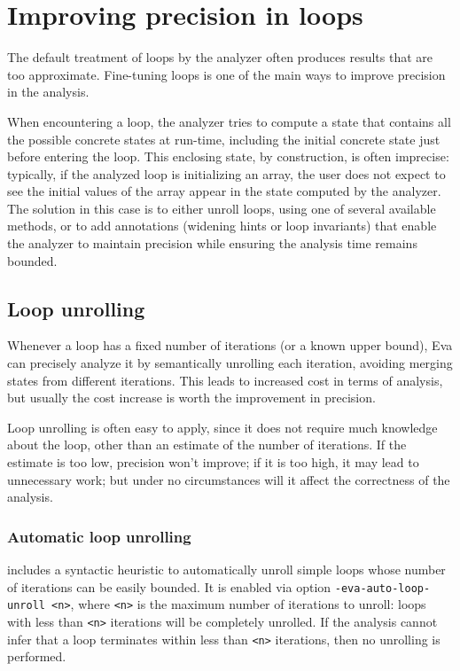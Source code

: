 \documentclass{frama-c-book}
\begin{document}
\section{Improving precision in loops}
\label{boucles-traitement}

The default treatment of loops by the analyzer often produces
results that are too approximate.
Fine-tuning loops is one of the main ways to improve precision in the analysis.

When encountering a loop, the analyzer tries to compute a state
that contains all the possible concrete states at run-time,
including the initial concrete state just before entering the loop.
This enclosing state, by construction, is often imprecise:
typically, if the analyzed loop is initializing an array,
the user does not expect to see the initial values of
the array appear in the state computed by the analyzer.
The solution in this case is to either unroll loops, using one of several
available methods, or to add annotations (widening hints or loop invariants)
that enable the analyzer to maintain precision while ensuring the analysis
time remains bounded.

\subsection{Loop unrolling}
\label{loop-unroll}

Whenever a loop has a fixed number of iterations (or a known upper bound),
Eva can precisely analyze it by semantically unrolling each iteration,
avoiding merging states from different iterations.
This leads to increased cost in terms of analysis, but usually the cost
increase is worth the improvement in precision.

Loop unrolling is often easy to apply, since it does not require much
knowledge about the loop, other than an estimate of the number of iterations.
If the estimate is too low, precision won't improve; if it is too high,
it may lead to unnecessary work; but under no circumstances will it affect the
correctness of the analysis.

\subsubsection{Automatic loop unrolling}

\Eva{} includes a syntactic heuristic to automatically unroll simple loops
whose number of iterations can be easily bounded.
It is enabled via option \lstinline|-eva-auto-loop-unroll <n>|, where
\lstinline|<n>| is the maximum number of iterations to unroll: loops with
less than \lstinline|<n>| iterations will be completely unrolled.
If the analysis cannot infer that a loop terminates within less than
\lstinline|<n>| iterations, then no unrolling is performed.
\end{document}
